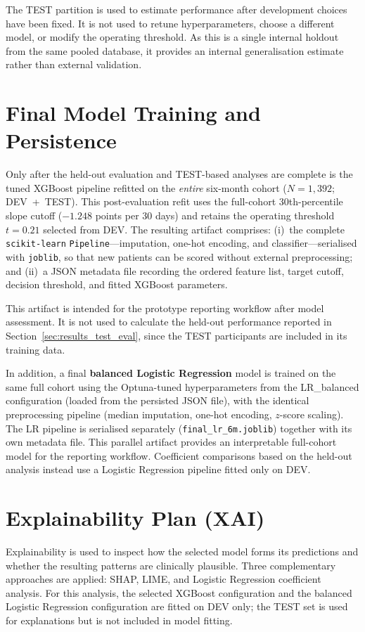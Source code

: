 The TEST partition is used to estimate performance after development choices have been fixed. It is not used to retune hyperparameters, choose a different model, or modify the operating threshold. As this is a single internal holdout from the same pooled database, it provides an internal generalisation estimate rather than external validation.

\section{Final Model Training and Persistence}
\label{sec:methods_final_model}
Only after the held-out evaluation and TEST-based analyses are complete is the tuned XGBoost pipeline refitted on the \textit{entire} six-month cohort ($N\!=\!1{,}392$; \gls{DEV}~+~\gls{TEST}). This post-evaluation refit uses the full-cohort 30th-percentile slope cutoff ($-1.248$ points per 30 days) and retains the operating threshold $t=0.21$ selected from DEV.
The resulting artifact comprises:
(i)~the complete \texttt{scikit-learn} \texttt{Pipeline}---imputation, one-hot encoding, and classifier---serialised with \texttt{joblib}, so that new patients can be scored without external preprocessing; and
(ii)~a \gls{JSON} metadata file recording the ordered feature list, target cutoff, decision threshold, and fitted XGBoost parameters.

This artifact is intended for the prototype reporting workflow after model assessment. It is not used to calculate the held-out performance reported in Section~\ref{sec:results_test_eval}, since the TEST participants are included in its training data.

In addition, a final \textbf{balanced Logistic Regression} model is trained on the same full cohort using the Optuna-tuned hyperparameters from the LR\_balanced configuration (loaded from the persisted \gls{JSON} file), with the identical preprocessing pipeline (median imputation, one-hot encoding, $z$-score scaling).
The \gls{LR} pipeline is serialised separately (\texttt{final\_lr\_6m.joblib}) together with its own metadata file.
This parallel artifact provides an interpretable full-cohort model for the reporting workflow. Coefficient comparisons based on the held-out analysis instead use a Logistic Regression pipeline fitted only on DEV.

\section{Explainability Plan (XAI)}
\label{sec:methods_xai_plan}
Explainability is used to inspect how the selected model forms its predictions and whether the resulting patterns are clinically plausible.
Three complementary approaches are applied: \gls{SHAP}, \gls{LIME}, and Logistic Regression coefficient analysis.
For this analysis, the selected XGBoost configuration and the balanced Logistic Regression configuration are fitted on DEV only; the \gls{TEST} set is used for explanations but is not included in model fitting.

